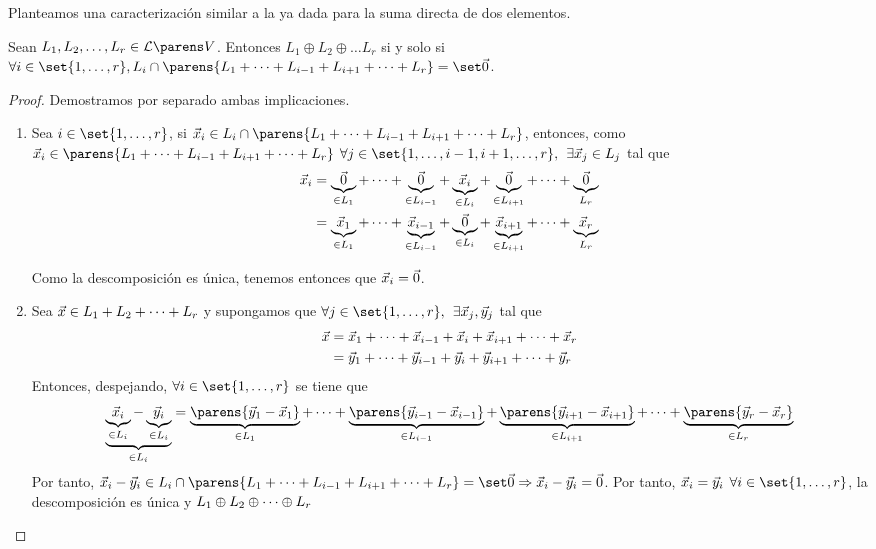\documentclass[../algebra_lineal.tex]{subfiles}
\begin{document}
Planteamos una caracterización similar a la ya dada para la suma directa de dos elementos.
\begin{proposition}
    Sean $\dlst{L}{r} \in \subespaciosde{V}$. Entonces $L_1 \oplus L_2 \oplus \dots L_r$ si y solo si $\forall i \in \set{1, \dots, r}, \zvsint{L_i}{\parens{\pidlst{L}{r}{i}{+}}}$.
\end{proposition}
\begin{proof}
    Demostramos por separado ambas implicaciones.
    \begin{enumerate}
        \item[\protect\fbox{$\Rightarrow$}] Sea $ i \in \set{1, \dots, r}$, si $\vx_i \in L_i \cap \parens{\pidlst{L}{r}{i}{+}}$, entonces, como $\vx_i \in \parens{\pidlst{L}{r}{i}{+}} \spc  \forall j \in \set{1, \dots, i-1, i+1, \dots, r}, \spc \exists \vx_j \in L_j$ tal que
        \begin{align*}
            \vx_i &= \underbrace{\zv}_{\in L_1} + \dots + \underbrace{\zv}_{\in L_{i-1}} + \underbrace{\vx_i}_{\in L_i} + \underbrace{\zv}_{\in L_{i+1}} + \dots + \underbrace{\zv}_{L_{r}} \\
                 &=  \underbrace{\vx_1}_{\in L_1} + \dots + \underbrace{\vx_{i-1}}_{\in L_{i-1}} + \underbrace{\zv}_{\in L_i} + \underbrace{\vx_{i+1}}_{\in L_{i+1}} + \dots + \underbrace{\vx_{r}}_{L_{r}}
        \end{align*}
        
        Como la descomposición es única, tenemos entonces que $\vx_i = \zv$.
        
        \item[\protect\fbox{$\Leftarrow$}] Sea $\vx \in \pdlst{L}{r}{+}$ y supongamos que $\forall j \in \set{1, \dots, r}, \spc \exists \vx_j, \vy_j$ tal que
        \begin{align*}
            \vx &= \pcvlst{x}{r}{i}{+} \\
                &= \pcvlst{y}{r}{i}{+}
        \end{align*}
        Entonces, despejando, $\forall i \in \set{1, \dots, r}$ se tiene que 
        \[
            \underbrace{\underbrace{\vx_i}_{\in L_i} - \underbrace{\vy_i}_{\in L_i}}_{\in L_i} = \underbrace{\parens{\vy_1 - \vx_1}}_{\in L_1} + \dots + \underbrace{\parens{\vy_{i-1} - \vx_{i-1}}}_{\in L_{i-1}} + \underbrace{\parens{\vy_{i+1} - \vx_{i+1}}}_{\in L_{i+1}} + \dots + \underbrace{\parens{\vy_{r} - \vx_{r}}}_{\in L_r} 
        \]
        Por tanto, $\vx_i - \vy_i \in L_i \cap \parens{\pidlst{L}{r}{i}{+}} = \zvs \Rightarrow \vx_i - \vy_i = \zv$. Por tanto, $\vx_i = \vy_i \spc \forall i \in \set{1, \dots, r}$, la descomposición es única y $\pdlst{L}{r}{\oplus}$
    \end{enumerate}
\end{proof}
\end{document}
